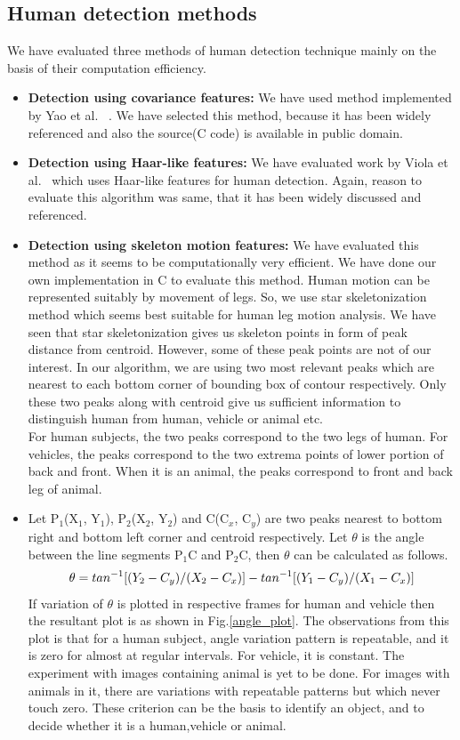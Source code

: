 \subsection{Human detection methods}
\indent We have evaluated three methods of human detection technique mainly on the
basis of their computation efficiency.
\begin{itemize}
\item \textbf{Detection using covariance features:} We have used method
	implemented by Yao et al. ~\cite{19}. We have selected this
	method, because it has been widely referenced and also the
	source(C code) is available in public domain.
\item \textbf{Detection using Haar-like features:} We have evaluated
	work by Viola et al.~\cite{16, 17} which uses Haar-like
	features for human detection. Again, reason to evaluate this
	algorithm was same, that it has been widely discussed and
	referenced.
\item \textbf{Detection using skeleton motion features:} We have
	evaluated this method as it seems to be computationally very
	efficient.  We have done our own implementation in C to evaluate
	this method.  Human motion can be represented suitably by
	movement of legs. So, we use star skeletonization method which
	seems best suitable for human leg motion analysis. We have seen
	that star skeletonization gives us skeleton points in form of peak
	distance from centroid. However, some of these peak points are
	not of our interest. In our algorithm, we are using two most relevant
	peaks which are nearest to each bottom corner of bounding box of
	contour respectively. Only these two peaks along with centroid
	give us sufficient information to distinguish human from
	human, vehicle or animal etc.\\
\indent For human subjects, the two peaks correspond to the two legs of
human. For vehicles, the peaks correspond to the two extrema points of
lower portion of back and front.  When it is an animal, the peaks
correspond to front and back leg of animal.\\
\item Let P$_1$(X$_1$, Y$_1$), P$_2$(X$_2$, Y$_2$) and C(C$_x$, C$_y$)
are two peaks nearest to bottom right and bottom left corner and
centroid respectively. Let $\theta$ is the angle between the line
segments P$_1$C and P$_2$C, then $\theta$ can be calculated as
follows.\\
%
	\begin{equation}
	\theta = tan^{-1}[(Y_2 - C_y) / (X_2 - C_x)] \\ - tan^{-1}[(Y_1 - C_y) / (X_1 - C_x)]
	\end{equation}
%
\indent If variation of $\theta$ is plotted in respective frames for
human and vehicle then the resultant plot is as shown in
Fig.\ref{angle_plot}.  The observations from this plot is that for a
human subject, angle variation pattern is repeatable, and it is zero for
almost at regular intervals.  For vehicle, it is constant. The
experiment with images containing animal is yet to be done. For images
with animals in it, there are variations with repeatable patterns but
which never touch zero.  These criterion can be the basis to identify an
object, and to decide whether it is a human,vehicle or animal.


\end{itemize}
